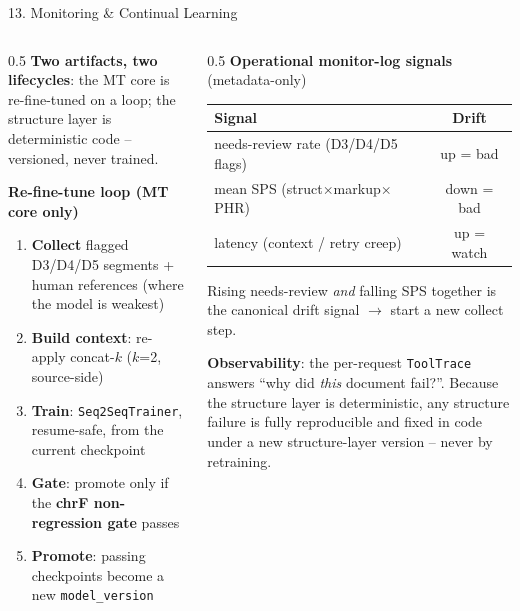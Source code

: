 \documentclass[10pt,aspectratio=169]{beamer}
\begin{document}
\begin{frame}{13. Monitoring \& Continual Learning}
\begin{columns}[T]
\begin{column}{0.5\textwidth}
\textbf{Two artifacts, two lifecycles}: the MT core is re-fine-tuned on a loop; the structure layer is deterministic code -- versioned, never trained.

\vspace{0.1cm}
\textbf{Re-fine-tune loop (MT core only)}
\begin{enumerate}\small
  \item \textbf{Collect} flagged D3/D4/D5 segments + human references (where the model is weakest)
  \item \textbf{Build context}: re-apply concat-$k$ ($k$=2, source-side)
  \item \textbf{Train}: \texttt{Seq2SeqTrainer}, resume-safe, from the current checkpoint
  \item \textbf{Gate}: promote only if the \textbf{chrF non-regression gate} passes
  \item \textbf{Promote}: passing checkpoints become a new \texttt{model\_version}
\end{enumerate}
\end{column}
\begin{column}{0.5\textwidth}
\textbf{Operational monitor-log signals} (metadata-only)
\begin{table}[h]
\centering\scriptsize
\begin{tabular}{lc}
\toprule
\textbf{Signal} & \textbf{Drift} \\
\midrule
needs-review rate (D3/D4/D5 flags) & up = bad \\
mean SPS (struct$\times$markup$\times$PHR) & down = bad \\
latency (context / retry creep) & up = watch \\
\bottomrule
\end{tabular}
\end{table}
\scriptsize Rising needs-review \emph{and} falling SPS together is the canonical drift signal $\rightarrow$ start a new collect step.

\vspace{0.1cm}
\scriptsize \textbf{Observability}: the per-request \texttt{ToolTrace} answers ``why did \emph{this} document fail?''. Because the structure layer is deterministic, any structure failure is fully reproducible and fixed in code under a new structure-layer version -- never by retraining.
\end{column}
\end{columns}
\end{frame}
\end{document}
